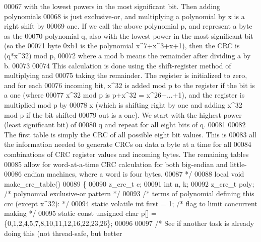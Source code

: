 \begin{DoxyCode}
00067 \textcolor{comment}{  with the lowest powers in the most significant bit.  Then adding polynomials}
00068 \textcolor{comment}{  is just exclusive-or, and multiplying a polynomial by x is a right shift by}
00069 \textcolor{comment}{  one.  If we call the above polynomial p, and represent a byte as the}
00070 \textcolor{comment}{  polynomial q, also with the lowest power in the most significant bit (so the}
00071 \textcolor{comment}{  byte 0xb1 is the polynomial x^7+x^3+x+1), then the CRC is (q*x^32) mod p,}
00072 \textcolor{comment}{  where a mod b means the remainder after dividing a by b.}
00073 \textcolor{comment}{}
00074 \textcolor{comment}{  This calculation is done using the shift-register method of multiplying and}
00075 \textcolor{comment}{  taking the remainder.  The register is initialized to zero, and for each}
00076 \textcolor{comment}{  incoming bit, x^32 is added mod p to the register if the bit is a one (where}
00077 \textcolor{comment}{  x^32 mod p is p+x^32 = x^26+...+1), and the register is multiplied mod p by}
00078 \textcolor{comment}{  x (which is shifting right by one and adding x^32 mod p if the bit shifted}
00079 \textcolor{comment}{  out is a one).  We start with the highest power (least significant bit) of}
00080 \textcolor{comment}{  q and repeat for all eight bits of q.}
00081 \textcolor{comment}{}
00082 \textcolor{comment}{  The first table is simply the CRC of all possible eight bit values.  This is}
00083 \textcolor{comment}{  all the information needed to generate CRCs on data a byte at a time for all}
00084 \textcolor{comment}{  combinations of CRC register values and incoming bytes.  The remaining tables}
00085 \textcolor{comment}{  allow for word-at-a-time CRC calculation for both big-endian and little-}
00086 \textcolor{comment}{  endian machines, where a word is four bytes.}
00087 \textcolor{comment}{*/}
00088 local \textcolor{keywordtype}{void} make\_crc\_table()
00089 \{
00090     z\_crc\_t c;
00091     \textcolor{keywordtype}{int} n, k;
00092     z\_crc\_t poly;                       \textcolor{comment}{/* polynomial exclusive-or pattern */}
00093     \textcolor{comment}{/* terms of polynomial defining this crc (except x^32): */}
00094     \textcolor{keyword}{static} \textcolor{keyword}{volatile} \textcolor{keywordtype}{int} first = 1;      \textcolor{comment}{/* flag to limit concurrent making */}
00095     \textcolor{keyword}{static} \textcolor{keyword}{const} \textcolor{keywordtype}{unsigned} \textcolor{keywordtype}{char} p[] = \{0,1,2,4,5,7,8,10,11,12,16,22,23,26\};
00096 
00097     \textcolor{comment}{/* See if another task is already doing this (not thread-safe, but better}

\end{DoxyCode}
